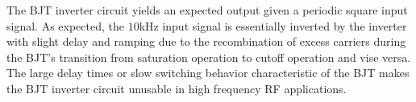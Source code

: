 The BJT inverter circuit yields an expected output given a periodic square input signal. As expected, the $10$\si{\kilo\hertz} input signal is essentially inverted by the inverter with slight delay and ramping due to the recombination of excess carriers during the BJT's transition from saturation operation to cutoff operation and vise versa. The large delay times or slow switching behavior characteristic of the BJT makes the BJT inverter circuit unusable in high frequency RF applications. 